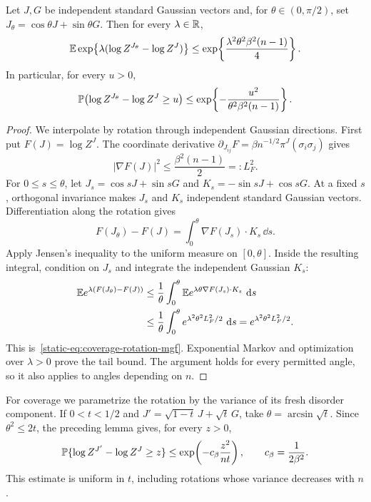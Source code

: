 \begin{lemma}\label{static-lem:coverage-rotation}
Let $J,G$ be independent standard Gaussian vectors and, for
$\theta\in(0,\pi/2)$, set $J_\theta=\cos\theta J+\sin\theta G$. Then
for every $\lambda\in\mathbb R$,
\begin{equation}\label{static-eq:coverage-rotation-mgf}
 \mathbb E\exp\!\left\{\lambda(\log Z^{J_\theta}-\log Z^J)\right\}
 \le\exp\!\left\{\frac{\lambda^2\theta^2\beta^2(n-1)}4\right\}.
\end{equation}
In particular, for every $u>0$,
\begin{equation}\label{static-eq:coverage-rotation-tail}
 \mathbb P\!\left(\log Z^{J_\theta}-\log Z^J\ge u\right)
 \le\exp\!\left\{-\frac{u^2}{\theta^2\beta^2(n-1)}\right\}.
\end{equation}
\end{lemma}

\begin{proof}
We interpolate by rotation through independent Gaussian directions.
First put $F(J)=\log Z^J$. The coordinate derivative
$\partial_{J_{ij}}F=\beta n^{-1/2}\pi^J(\sigma_i\sigma_j)$ gives
\[
 |\nabla F(J)|^2\le\frac{\beta^2(n-1)}2=:L_F^2.
\]
For $0\le s\le\theta$, let
$J_s=\cos sJ+\sin sG$ and $K_s=-\sin sJ+\cos sG$.
At a fixed $s$, orthogonal invariance makes $J_s$ and $K_s$
independent standard Gaussian vectors. Differentiation along the
rotation gives
\[
 F(J_\theta)-F(J)=\int_0^\theta\nabla F(J_s)\cdot K_s\,\dd s.
\]
Apply Jensen's inequality to the uniform measure on $[0,\theta]$.
Inside the resulting integral, condition on $J_s$ and integrate the
independent Gaussian $K_s$:
\begin{align*}
 \mathbb E e^{\lambda(F(J_\theta)-F(J))}
 &\le\frac1\theta\int_0^\theta
 \mathbb E e^{\lambda\theta\nabla F(J_s)\cdot K_s}\,\,\mathrm d s\\
 &\le\frac1\theta\int_0^\theta
 e^{\lambda^2\theta^2L_F^2/2}\,\,\mathrm d s
 =e^{\lambda^2\theta^2L_F^2/2}.
\end{align*}
This is~\eqref{static-eq:coverage-rotation-mgf}. Exponential Markov
and optimization over $\lambda>0$ prove the tail bound. The argument
holds for every permitted angle, so it also applies to angles depending
on $n$.
\end{proof}

For coverage we parametrize the rotation by the variance of its fresh
disorder component. If $0<t<1/2$ and
$J'=\sqrt{1-t}\,J+\sqrt t\,G$, take
$\theta=\arcsin\sqrt t$. Since $\theta^2\le2t$, the preceding lemma gives,
for every $z>0$,
\begin{equation}\label{eq:rotation-tail}
 \mathbb P\{\log Z^{J'}-\log Z^J\ge z\}
 \le\exp\!\left(-c_\beta\frac{z^2}{nt}\right),
 \qquad c_\beta=\frac1{2\beta^2}.
\end{equation}
This estimate is uniform in $t$, including rotations whose variance
decreases with $n$.
